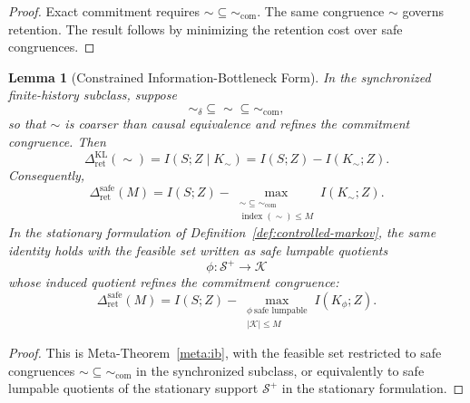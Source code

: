 \documentclass[12pt]{article}
\newtheorem{lemma}[theorem]{Lemma}
\theoremstyle{definition}
\newcommand{\Splus}{\mathcal S^{+}}
\begin{document}
\begin{proof}
Exact commitment requires $\sim\subseteq\sim_{\mathrm{com}}$.  The same
congruence $\sim$ governs retention.  The result follows by minimizing the
retention cost over safe congruences.
\end{proof}

\begin{lemma}[Constrained Information-Bottleneck Form]
\label{lem:constrained-ib}
In the synchronized finite-history subclass, suppose
\[
\sim_\delta\subseteq\sim\subseteq\sim_{\mathrm{com}},
\]
so that $\sim$ is coarser than causal equivalence and refines the commitment
congruence.  Then
\[
\Delta_{\mathrm{ret}}^{\mathrm{KL}}(\sim)
=
I(S;Z\mid K_\sim)
=
I(S;Z)-I(K_\sim;Z).
\]
Consequently,
\[
\Delta_{\mathrm{ret}}^{\mathrm{safe}}(M)
=
I(S;Z)
-
\max_{\substack{
\sim\subseteq\sim_{\mathrm{com}}\\
\operatorname{index}(\sim)\le M
}}
I(K_\sim;Z).
\]
In the stationary formulation of
Definition~\ref{def:controlled-markov}, the same identity holds with the
feasible set written as safe lumpable quotients
\[
\phi:\Splus\to\mathcal K
\]
whose induced quotient refines the commitment congruence:
\[
\Delta_{\mathrm{ret}}^{\mathrm{safe}}(M)
=
I(S;Z)
-
\max_{\substack{
\phi\ \text{safe lumpable}\\
|\mathcal K|\le M
}}
I(K_\phi;Z).
\]
\end{lemma}

\begin{proof}
This is Meta-Theorem~\ref{meta:ib}, with the feasible set restricted to safe
congruences $\sim\subseteq\sim_{\mathrm{com}}$ in the synchronized subclass,
or equivalently to safe lumpable quotients of the stationary support
$\Splus$ in the stationary formulation.
\end{proof}
\end{document}
